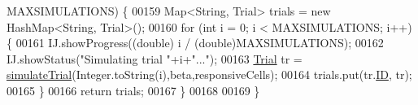 \begin{DoxyCode}
      MAXSIMULATIONS) \{
00159     Map<String, Trial> trials = \textcolor{keyword}{new} HashMap<String, Trial>();
00160     \textcolor{keywordflow}{for} (\textcolor{keywordtype}{int} i = 0; i < MAXSIMULATIONS; i++) \{
00161       IJ.showProgress((\textcolor{keywordtype}{double}) i / (\textcolor{keywordtype}{double})MAXSIMULATIONS);
00162       IJ.showStatus(\textcolor{stringliteral}{"Simulating trial "}+i+\textcolor{stringliteral}{"..."});
00163       \hyperlink{classdata_1_1_trial}{Trial} tr = \hyperlink{classfunctions_1_1_trial_manager_a394d1db5cf1132ef09b270f9b691ec17}{simulateTrial}(Integer.toString(i),beta,responsiveCells);
00164       trials.put(tr.\hyperlink{classdata_1_1_trial_a317298c3409575f71e43acd3f73ce295}{ID}, tr);
00165     \}
00166     \textcolor{keywordflow}{return} trials;
00167   \}
00168 
00169 \}
\end{DoxyCode}
